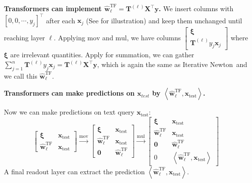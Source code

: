 \documentclass[11pt]{article}
\theoremstyle{plain}
\theoremstyle{definition}
\theoremstyle{remark}
\newcommand{\zero}{\boldsymbol{0}}
\renewcommand{\^}[1]{^{(#1)}}
\newcommand{\bx}{\boldsymbol{x}}
\newcommand{\bxi}{\boldsymbol{\xi}}
\newcommand{\bX}{\boldsymbol{X}}
\newcommand{\by}{\boldsymbol{y}}
\newcommand{\bT}{\boldsymbol{T}}
\newcommand{\bw}{\boldsymbol{w}}
\newcommand{\inner}[1]{ \left\langle {#1} \right\rangle }
\newcommand{\newton}{Iterative Newton}
\renewcommand{\paragraph}[1]{\vspace{1mm}\noindent\textbf{#1}}
\begin{document}
\paragraph{Transformers can implement $\hat{\bw}_\ell^\mathrm{TF} = \bT^{(\ell)} \bX^\top \by$.}
We insert columns with $[0, 0, \cdots, y_j]^\top$ after each $\bx_j$ (See  for illustration) and keep them unchanged until reaching layer $\ell$. Applying $\mathrm{mov}$ and $\mathrm{mul}$, we have columns $\begin{bmatrix}
    \bxi \\ \bT^{(\ell)} y_j \bx_j
\end{bmatrix}$ where $\bxi$ are irrelevant quantities. Apply  for summation, we can gather $\sum_{j=1}^n \bT^{(\ell)} y_j \bx_j = \bT^{(\ell)} \bX^\top \by$, which is again the same as \newton\ and we call this $\hat{\bw}_\ell^\mathrm{TF}$. 

\paragraph{Transformers can make predictions on $\bx_{test}$ by $\inner{\hat{\bw}_\ell^\mathrm{TF}, \bx_\mathrm{test}}$.} 

Now we can make predictions on text query $\bx_\mathrm{test}$:
\begin{equation}
    \begin{bmatrix}
        \bxi &  \bx_\mathrm{test} \\
        \hat{\bw}_\ell^\mathrm{TF} & \bx_\mathrm{test}
    \end{bmatrix} \overset{\mathrm{mov}}{\longrightarrow} \begin{bmatrix}
        \bxi &  \bx_\mathrm{test} \\
        \hat{\bw}_\ell^\mathrm{TF} & \bx_\mathrm{test} \\
        \zero & \hat{\bw}_\ell^\mathrm{TF}
    \end{bmatrix} \overset{\mathrm{mul}}{\longrightarrow} \begin{bmatrix}
        \bxi &  \bx_\mathrm{test} \\
        \hat{\bw}_\ell^\mathrm{TF} & \bx_\mathrm{test} \\
        \zero & \hat{\bw}_\ell^\mathrm{TF} \\
        0 & \inner{\hat{\bw}_\ell^\mathrm{TF}, \bx_\mathrm{test}}
    \end{bmatrix}
\end{equation}
A final readout layer can extract the prediction $\inner{\hat{\bw}_\ell^\mathrm{TF}, \bx_\mathrm{test}}$.
\end{document}

